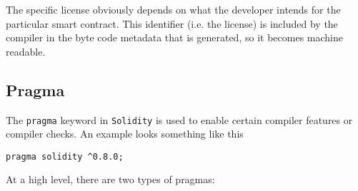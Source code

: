 The specific license obviously depends on what the developer intends for the particular smart contract.
This identifier (i.e. the license) is included by the compiler in the byte code metadata that is generated, so it becomes machine readable.

\subsection*{Pragma}

The \texttt{pragma} keyword in \texttt{Solidity} is used to enable certain compiler features or compiler checks.
An example looks something like this

\begin{lstlisting}[language=Solidity, style=solStyle, caption={Example of pragma statement.}]
pragma solidity ^0.8.0;
\end{lstlisting}

At a high level, there are two types of pragmas:

